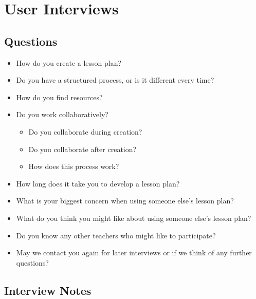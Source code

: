 \documentclass[10pt,letter]{article}
\begin{document}
\pagebreak
\appendix

\section{User Interviews}

\subsection{Questions}
\label{interview questions}
\begin{itemize}
	\item How do you create a lesson plan?

	\item Do you have a structured process, or is it different every time?

	\item How do you find resources?

	\item Do you work collaboratively?
	\begin{itemize}
		\item Do you collaborate during creation?

		\item Do you collaborate after creation?

		\item How does this process work?
	\end{itemize}

	\item How long does it take you to develop a lesson plan?

	\item What is your biggest concern when using someone else's lesson plan?

	\item What do you think you might like about using someone else's lesson
		plan?

	\item Do you know any other teachers who might like to participate?

	\item May we contact you again for later interviews or if we think of any
		further questions?
\end{itemize}

\subsection{Interview Notes}
\begingroup
\let\section\subsubsection
\label{interview notes}

\endgroup
\end{document}
